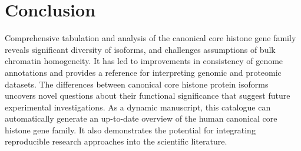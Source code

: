 \section{Conclusion}

  Comprehensive tabulation and analysis of the canonical core histone gene family
  reveals significant diversity of isoforms,
  and challenges assumptions of bulk chromatin homogeneity.
  It has led to improvements in consistency of genome annotations
  and provides a reference for interpreting genomic and proteomic datasets.
  The differences between canonical core histone protein isoforms
  uncovers novel questions about their functional significance
  that suggest future experimental investigations.
  As a dynamic manuscript, this catalogue can automatically generate an up-to-date overview
  of the human canonical core histone gene family.
  It also demonstrates the potential for integrating reproducible research approaches
  into the scientific literature.
